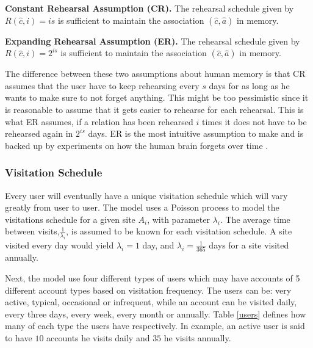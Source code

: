 \begin{requirement}\label{CR}
    \textbf{ Constant Rehearsal Assumption (CR)\cite{naturally-rehearsing}.} The rehearsal schedule given by $R(\hat c, i) = i s$ is sufficient to maintain the association $(\hat c, \hat a)$ in memory.
\end{requirement}

\begin{requirement}\label{ER}
    \textbf{Expanding Rehearsal Assumption (ER)\cite{naturally-rehearsing}.} The rehearsal schedule given by $R(\hat c, i)=2^{i s}$ is sufficient to maintain the association $(\hat c, \hat a)$ in memory.
\end{requirement}

The difference between these two assumptions about human memory is that CR assumes that the user have to keep rehearsing every $s$ days for as long as he wants to make sure to not forget anything. This might be too pessimistic since it is reasonable to assume that it gets easier to rehearse for each rehearsal. This is what ER assumes, if a relation has been rehearsed $i$ times it does not have to be rehearsed again in $2^{i s}$ days. ER is the most intuitive assumption to make and is backed up by experiments on how the human brain forgets over time \cite{forgetting, human-memory}.

\par 
\subsubsection{Visitation Schedule}
Every user will eventually have a unique visitation schedule which will vary greatly from user to user. The model uses a Poisson process to model the visitations schedule for a given site $A_i$, with parameter $\lambda_i$. The average time between visits,$\frac{1}{\lambda_i}$, is assumed to be known for each visitation schedule. A site visited every day would yield $\lambda_i = 1$ day, and $\lambda_i=\frac{1}{365}$ days for a site visited annually. 
\par Next, the model use four different types of users which may have accounts of 5 different account types based on visitation frequency. The users can be: very active, typical, occasional or infrequent, while an account can be visited daily, every three days, every week, every month or annually. Table \ref{users} defines how many of each type the users have respectively. In example, an active user is said to have $10$ accounts he visits daily and $35$ he visits annually.

